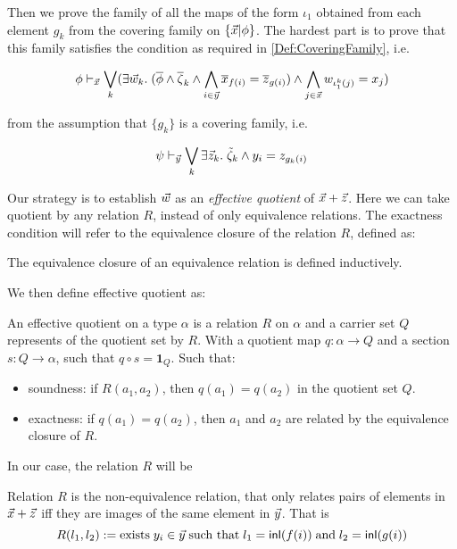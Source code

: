 Then we prove the family of all the maps of the form $\iota_1$ obtained from each element $g_k$ from the covering family on $\{ \vec{x} | \phi \}$.
The hardest part is to prove that this family satisfies the condition as required in \ref{Def:CoveringFamily}, i.e.

\begin{equation}
\phi \vdash_{\vec{x}} \bigvee_k (\exists\vec{w}_k.\;(\overline{\phi}\land \overline{\zeta}_k \land\bigwedge_{i\in \vec{y}} \overline{x}_{f(i)} = \overline{z}_{g(i)}) \land \bigwedge_{j\in\vec{x}}w_{{\iota^k_1(j)}} = x_j )
\end{equation}

from the assumption that $\{g_k\}$ is a covering family, i.e.

\[\psi\vdash_{\vec{y}} \bigvee_k \exists \vec{z}_k.\; \tilde{\zeta}_k\land y_i = z_{g_k(i)}\]


Our strategy is to establish $\vec{w}$ as an \emph{effective quotient} of $\vec{x}+ \vec{z}$.
Here we can take quotient by any relation $R$, instead of only equivalence relations.
The exactness condition will refer to the equivalence closure of the relation $R$, defined as:

\begin{definition}
  The equivalence closure of an equivalence relation is defined inductively.
  \leanok
\end{definition}

We then define effective quotient as:

\begin{definition}
  \leanok
  An effective quotient on a type $\alpha$ is a relation $R$ on $\alpha$ and a carrier set $Q$ represents of the quotient
  set by $R$. With a quotient map $q:\alpha\to Q$ and a section $s:Q\to \alpha$, such that $q\circ s = \mathbf{1}_Q$. Such that:
  \begin{itemize}
    \item soundness: if $R(a_1,a_2)$, then $q(a_1) = q(a_2)$ in the quotient set $Q$.
    \item exactness: if $q(a_1) = q(a_2)$, then $a_1$ and $a_2$ are related by the equivalence closure of $R$.
  \end{itemize}

\end{definition}

In our case, the relation $R$ will be



\begin{definition}[Relation defined by the equalities in $f(i) = g(i)$]
  Relation $R$ is the non-equivalence relation, that only relates pairs of elements in $\vec{x}+\vec{z}$
  iff they are images of the same element in $\vec{y}$. That is
  \begin{equation}
    R(l_1,l_2):= \text{exists}\; y_i \in \vec{y} \;\text{such that}\; l_1 = \mathsf{inl}(f(i))\; \text{and}\;  l_2 = \mathsf{inl}(g(i))
  \end{equation}
\end{definition}

